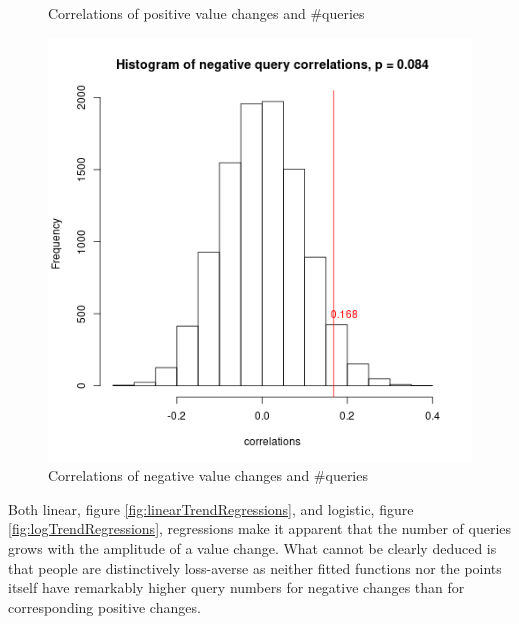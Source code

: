 \documentclass[12pt]{article}
\begin{document}
\begin{figure}[!htb]
  \caption{Correlations of positive value changes and \#queries}\label{fig:posTrendCorrelation}
\endminipage\hfill
{}%
  \includegraphics[width=\linewidth]{negativeQueryCorrelations.png}
  \caption{Correlations of negative value changes and \#queries}\label{fig:negTrendCorrelation}
\endminipage
\end{figure}



Both linear, figure \ref{fig:linearTrendRegressions}, and logistic, figure \ref{fig:logTrendRegressions}, regressions make it apparent that the number of queries grows with the amplitude of a value change. What cannot be clearly deduced is that people are distinctively loss-averse as neither fitted functions nor the points itself have remarkably higher query numbers for negative changes than for corresponding positive changes.
\end{document}
